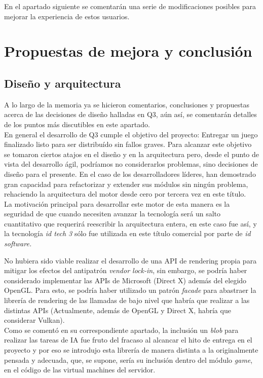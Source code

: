 \documentclass[a4paper,12pt]{report}
\begin{document}
    En el apartado siguiente se comentarán una serie de modificaciones posibles para mejorar la experiencia de estos usuarios.
    
	
	\section{Propuestas de mejora y conclusión}
	
    \subsection{Diseño y arquitectura}
    A lo largo de la memoria ya se hicieron comentarios, conclusiones y propuestas acerca de las decisiones de diseño halladas en Q3, aún así, se comentarán detalles de los puntos más discutibles en este apartado.\\
    
    En general el desarrollo de Q3 cumple el objetivo del proyecto: Entregar un juego finalizado listo para ser distribuído sin fallos graves. Para alcanzar este objetivo se tomaron ciertos atajos en el diseño y en la arquitectura pero, desde el punto de vista del desarrollo ágil, podríamos no considerarlos problemas, sino decisiones de diseño para el presente. En el caso de los desarrolladores líderes, han demostrado gran capacidad para refactorizar y extender sus módulos sin ningún problema, rehaciendo la arquitectura del motor desde cero por tercera vez en este título.\\

	\newpage    
    La motivación principal para desarrollar este motor de esta manera es la seguridad de que cuando necesiten avanzar la tecnología será un salto cuantitativo que requerirá reescribir la arquitectura entera, en este caso fue así, y la tecnología \textit{id tech 3} sólo fue utilizada en este título comercial por parte de \textit{id software.}
    
    No hubiera sido viable realizar el desarrollo de una API de rendering propia para mitigar los efectos del antipatrón \textit{vendor lock-in}, sin embargo, se podría haber considerado implementar las APIs de Microsoft (Direct X) además del elegido OpenGL. Para esto, se podría haber utilizado un patrón \textit{facade} para abastraer la librería de rendering de las llamadas de bajo nivel que habría que realizar a las distintas APIs (Actualmente, además de OpenGL y Direct X, habría que considerar Vulkan).\\
    
    Como se comentó en su correspondiente apartado, la inclusión un \textit{blob} para realizar las tareas de IA fue fruto del fracaso al alcancar el hito de entrega en el proyecto y por eso se introdujo esta librería de manera distinta a la originalmente pensada y adecuada, que, se supone, sería su inclusión dentro del módulo \textit{game}, en el código de las virtual machines del servidor.\\
    
\end{document}
